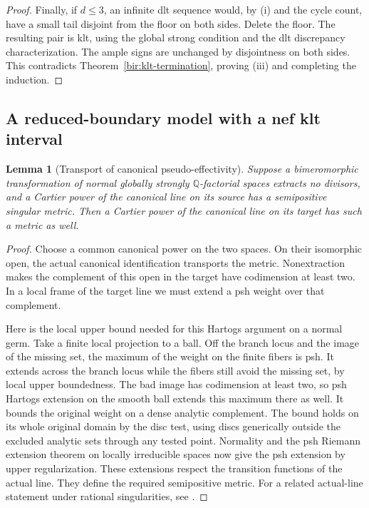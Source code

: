 \documentclass[11pt,letterpaper]{article}
\newtheorem{lemma}[theorem]{Lemma}
\theoremstyle{definition}
\theoremstyle{remark}
\begin{document}
\begin{proof}
Finally, if $d\leq3$, an infinite dlt sequence would, by (i) and the
cycle count, have a small tail disjoint from the floor on both
sides.  Delete the floor.  The resulting pair is klt, using the
global strong condition and the dlt discrepancy characterization.
The ample signs are unchanged by disjointness on both sides.
This contradicts Theorem~\ref{bir:klt-termination}, proving (iii)
and completing the induction.
\end{proof}

\subsection{A reduced-boundary model with a nef klt interval}
\label{bir:reduced-section}

\begin{lemma}[Transport of canonical pseudo-effectivity]
\label{bir:pseudoeffective-transport}
Suppose a bimeromorphic transformation of normal globally strongly
$\mathbb{Q}$-factorial spaces extracts no divisors, and a Cartier power of
the canonical line on its source has a semipositive singular metric.
Then a Cartier power of the canonical line on its target has such
a metric as well.
\end{lemma}

\begin{proof}
Choose a common canonical power on the two spaces.  On their
isomorphic open, the actual canonical identification transports the
metric.  Nonextraction makes the complement of this open in the
target have codimension at least two.  In a local frame of the
target line we must extend a psh weight over that complement.

Here is the local upper bound needed for this Hartogs argument on a
normal germ.  Take a finite local projection to a ball.  Off the
branch locus and the image of the missing set, the maximum of the
weight on the finite fibers is psh.  It extends across the branch
locus while the fibers still avoid the missing set, by local upper
boundedness.  The bad image has codimension at least two, so psh
Hartogs extension on the smooth ball extends this maximum there as
well.  It bounds the original weight on a dense analytic complement.
The bound holds on its whole original domain by the disc test,
using discs generically outside the excluded analytic sets through
any tested point.  Normality and the psh Riemann extension theorem
on locally irreducible spaces now give the psh extension by upper
regularization.  These extensions respect the transition functions
of the actual line.  They define the required semipositive metric.
For a related actual-line statement under rational singularities,
see \cite[Lemma~3.6]{HLLNonvanishing}.
\end{proof}
\end{document}
